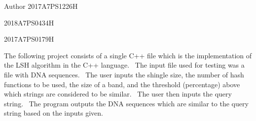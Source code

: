 \begin{DoxyAuthor}{Author}
2017A7\+P\+S1226H 

2018A7\+P\+S0434H 

2017A7\+P\+S0179H
\end{DoxyAuthor}
The following project consists of a single C++ file which is the implementation of the L\+SH algorithm in the C++ language.~\newline
 The input file used for testing was a file with D\+NA sequences.~\newline
 The user inputs the shingle size, the number of hash functions to be used, the size of a band, and the threshold (percentage) above which strings are considered to be similar.~\newline
 The user then inputs the query string.~\newline
 The program outputs the D\+NA sequences which are similar to the query string based on the inputs given.~\newline
 